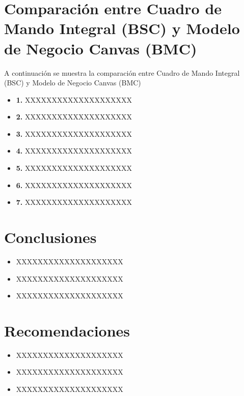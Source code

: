 \documentclass[preprint,12pt]{elsarticle}
\begin{document}



\section{Comparación entre Cuadro de Mando Integral (BSC) y Modelo de Negocio Canvas (BMC)}
A continuación se muestra la comparación entre Cuadro de Mando Integral (BSC) y Modelo de Negocio Canvas (BMC)
	
	\begin{itemize}

	\item{\textbf{1.}} XXXXXXXXXXXXXXXXXXXX
	\item{\textbf{2.}} XXXXXXXXXXXXXXXXXXXX
	\item{\textbf{3.}} XXXXXXXXXXXXXXXXXXXX
	\item{\textbf{4.}} XXXXXXXXXXXXXXXXXXXX
	\item{\textbf{5.}} XXXXXXXXXXXXXXXXXXXX
	\item{\textbf{6.}} XXXXXXXXXXXXXXXXXXXX
	\item{\textbf{7.}} XXXXXXXXXXXXXXXXXXXX
	\end{itemize}


\section{Conclusiones}

	\begin{itemize}
		\item XXXXXXXXXXXXXXXXXXXX
		\item XXXXXXXXXXXXXXXXXXXX
		\item XXXXXXXXXXXXXXXXXXXX
	\end{itemize}


\section{Recomendaciones}	

	\begin{itemize}
		\item XXXXXXXXXXXXXXXXXXXX
		\item XXXXXXXXXXXXXXXXXXXX
		\item XXXXXXXXXXXXXXXXXXXX
	\end{itemize}



	
	\newpage
	
		
\end{document}
